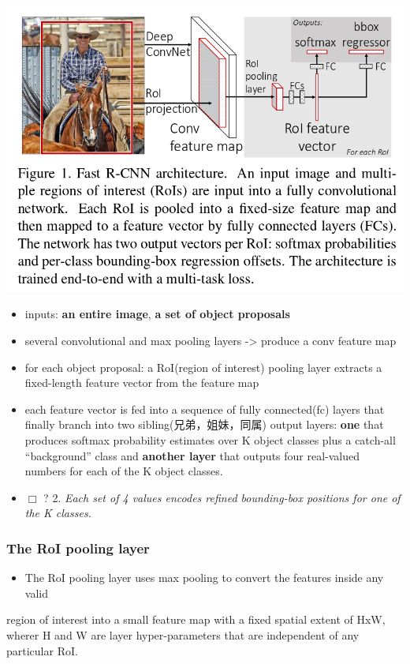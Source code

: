 \documentclass[11pt]{article}
\begin{document}
   \includegraphics[width=.9\linewidth]{./pic_fast_rcnn/1.png}
\begin{itemize}
\item inputs: \textbf{an entire image}, \textbf{a set of object proposals}
\item several convolutional and max pooling layers -> produce a conv feature map
\item for each object proposal: a RoI(region of interest) pooling layer extracts a 
     fixed-length feature vector from the feature map
\item each feature vector is fed into a sequence of fully connected(fc) layers 
     that finally branch into two sibling(兄弟，姐妹，同属) output layers:
     \textbf{one} that produces softmax probability estimates over K object classes
     plus a catch-all ``background'' class and \textbf{another layer} that outputs 
     four real-valued numbers for each of the K object classes.
\item $\Box$ ? 2. \emph{Each set of 4 values encodes refined bounding-box positions for one of            the K classes.}
\end{itemize}
\subsubsection{The RoI pooling layer}
\label{sec-2-1-1}

\begin{itemize}
\item The RoI pooling layer uses max pooling to convert the features inside any valid
\end{itemize}
    region of interest into a small feature map with a fixed spatial extent of HxW,
    wherer H and W are layer hyper-parameters that are independent of any particular RoI.
\end{document}
